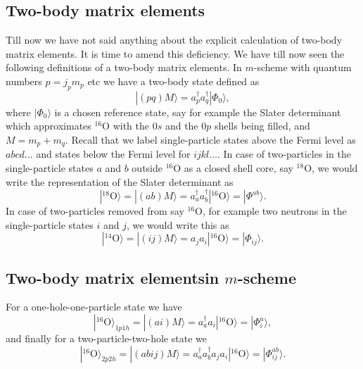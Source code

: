 \documentclass[%
twoside,                 %
final,                   %
10pt]{article}
\begin{document}
\subsection{Two-body matrix elements}
\begin{block}{}
Till now we have not said anything about the explicit calculation of two-body matrix elements. It is time to amend this deficiency.
We have till now seen the following definitions of a two-body matrix elements. In $m$-scheme
with quantum numbers $p=j_pm_p$ etc we have a two-body state defined as
\[
|(pq)M\rangle  = a^{\dagger}_pa^{\dagger}_q|\Phi_0\rangle,
\]
where $|\Phi_0\rangle$ is a chosen reference state, say for example the Slater determinant which approximates ${}^{16}\mbox{O}$ with the $0s$ and the $0p$ shells being filled, and $M=m_p+m_q$. Recall that we label single-particle states above the Fermi level as $abcd\dots$ and states below the Fermi level for $ijkl\dots$.  
In case of two-particles in the single-particle states $a$ and $b$ outside ${}^{16}\mbox{O}$ as a closed shell core, say ${}^{18}\mbox{O}$, 
we would write the representation of the Slater determinant as
\[
|^{18}\mathrm{O}\rangle =|(ab)M\rangle  = a^{\dagger}_aa^{\dagger}_b|^{16}\mathrm{O}\rangle=|\Phi^{ab}\rangle.
\]
In case of two-particles removed from say ${}^{16}\mbox{O}$, for example two neutrons in the single-particle states $i$ and $j$, we would write this as
\[
|^{14}\mathrm{O}\rangle =|(ij)M\rangle  = a_ja_i|^{16}\mathrm{O}\rangle=|\Phi_{ij}\rangle.
\]
\end{block}

\subsection{Two-body matrix elementsin $m$-scheme}
\begin{block}{}
For a one-hole-one-particle state we have
\[
|^{16}\mathrm{O}\rangle_{1p1h} =|(ai)M\rangle  = a_a^{\dagger}a_i|^{16}\mathrm{O}\rangle=|\Phi_{i}^a\rangle,
\]
and finally for a two-particle-two-hole state we 
\[
|^{16}\mathrm{O}\rangle_{2p2h} =|(abij)M\rangle  = a_a^{\dagger}a_b^{\dagger}a_ja_i|^{16}\mathrm{O}\rangle=|\Phi_{ij}^{ab}\rangle.
\]
\end{block}

\end{document}

